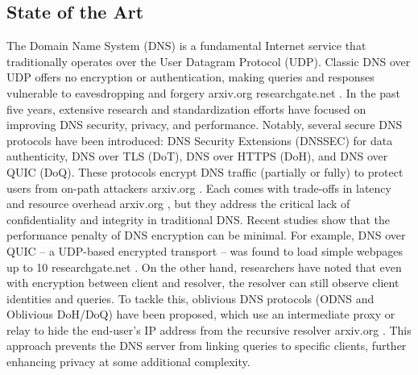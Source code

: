 \subsection{State of the Art}
The Domain Name System (DNS) is a fundamental Internet service that traditionally operates over the User Datagram Protocol (UDP). Classic DNS over UDP offers no encryption or authentication, making queries and responses vulnerable to eavesdropping and forgery
arxiv.org
researchgate.net
. In the past five years, extensive research and standardization efforts have focused on improving DNS security, privacy, and performance. Notably, several secure DNS protocols have been introduced: DNS Security Extensions (DNSSEC) for data authenticity, DNS over TLS (DoT), DNS over HTTPS (DoH), and DNS over QUIC (DoQ). These protocols encrypt DNS traffic (partially or fully) to protect users from on-path attackers
arxiv.org
. Each comes with trade-offs in latency and resource overhead
arxiv.org
, but they address the critical lack of confidentiality and integrity in traditional DNS. Recent studies show that the performance penalty of DNS encryption can be minimal. For example, DNS over QUIC – a UDP-based encrypted transport – was found to load simple webpages up to 10%
researchgate.net
. On the other hand, researchers have noted that even with encryption between client and resolver, the resolver can still observe client identities and queries. To tackle this, oblivious DNS protocols (ODNS and Oblivious DoH/DoQ) have been proposed, which use an intermediate proxy or relay to hide the end-user’s IP address from the recursive resolver
arxiv.org
. This approach prevents the DNS server from linking queries to specific clients, further enhancing privacy at some additional complexity.

